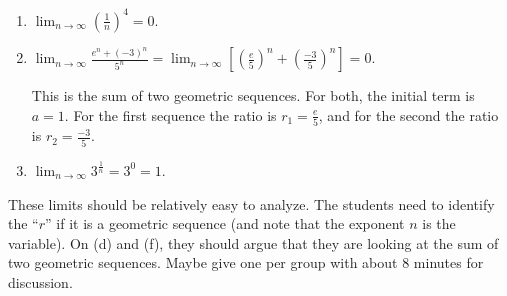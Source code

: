 \documentclass[noinstructornotes]{ximera}
\begin{document}
\begin{problem}
\begin{enumerate}
\begin{problem}
\begin{freeResponse}
\begin{enumerate}
	\item  $\lim_{n \to \infty} \left( \frac{1}{n} \right)^4 = 0$.  
	
	\item  $\lim_{n \to \infty} \frac{e^n + (-3)^n}{5^n} = \lim_{n \to \infty} \left[ \left( \frac{e}{5} \right)^n + \left( \frac{-3}{5} \right)^n \right] = 0.$  
	
	This is the sum of two geometric sequences.  
	For both, the initial term is $a = 1$.  
	For the first sequence the ratio is $r_1 = \frac{e}{5}$, and for the second the ratio is $r_2 = \frac{-3}{5}$.
	
	\item  $\lim_{n \to \infty} 3^\frac{1}{n} = 3^0 = 1$.  
	
	\end{enumerate}
	\end{freeResponse}

\end{problem}

\begin{instructorNotes}
These limits should be relatively easy to analyze.  
The students need to identify the ``$r$'' if it is a geometric sequence (and note that the exponent $n$ is the variable).  
On (d) and (f), they should argue that they are looking at the sum of two geometric sequences.  
Maybe give one per group with about $8$ minutes for discussion.  
\end{instructorNotes}








\end{enumerate}
\end{problem}
\end{document}

